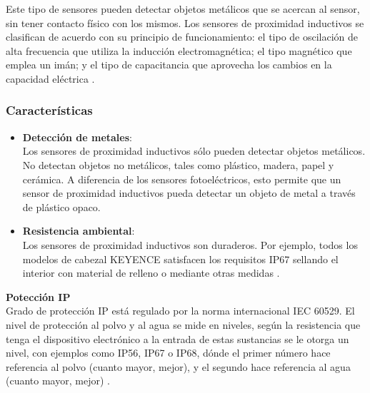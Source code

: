 %

Este tipo de sensores pueden detectar objetos metálicos que se acercan al 
sensor, sin tener contacto físico con los mismos. Los sensores de proximidad 
inductivos se clasifican de acuerdo con su principio de funcionamiento: el tipo 
de oscilación de alta frecuencia que utiliza la inducción electromagnética; el 
tipo magnético que emplea un imán; y el tipo de capacitancia que aprovecha los 
cambios en la capacidad eléctrica 
\cite{sensores:proximidad:inductivos:fundamentos}. \\

\subsubsection{Características}
\label{sec:sensores:capi:caracteristicas}

\begin{itemize}
	\item \textbf{Detección de metales}: \\
		Los sensores de proximidad inductivos sólo pueden detectar 
	objetos metálicos. No detectan objetos no metálicos, tales como 
	plástico, madera, papel y cerámica. A diferencia de los sensores 
	fotoeléctricos, esto permite que un sensor de proximidad inductivos 
	pueda detectar un objeto de metal a través de plástico opaco.

	\item \textbf{Resistencia ambiental}: \\
		Los sensores de proximidad inductivos son duraderos. Por 
	ejemplo, todos los modelos de cabezal KEYENCE satisfacen los requisitos 
	IP67 sellando el interior con material de relleno o mediante otras 
	medidas \cite{sensores:proximidad:inductivos:fundamentos}.

\end{itemize}

\textbf{Potección IP} \\
Grado de protección IP está regulado por la norma internacional IEC 60529.
El nivel de protección al polvo y al agua se mide en niveles, según la 
resistencia que tenga el dispositivo electrónico a la entrada de estas 
sustancias se le otorga un nivel, con ejemplos como IP56, IP67 o IP68, dónde el 
primer número hace referencia al polvo (cuanto mayor, mejor), y el segundo hace 
referencia al agua (cuanto mayor, mejor) 
\cite{sensores:proximidad:IP:tecnorium}. \\

